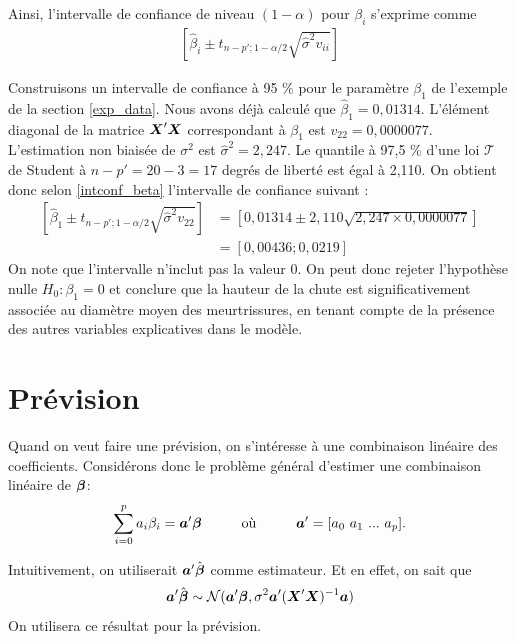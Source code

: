 Ainsi, l'intervalle de confiance de niveau $(1-\alpha)$ pour $\beta_i$ s'exprime comme
\begin{eqnarray}
\left[ \hat\beta_i\pm t_{n-p';1-\alpha/2}\sqrt{\hat\sigma^2 v_{ii}} \right]
\label{intconf_beta}
\end{eqnarray}

\begin{exemple}
Construisons un intervalle de confiance à 95 $\%$ pour le paramètre $\beta_1$ de l'exemple de la section \ref{exp_data}. Nous avons déjà calculé que $\hat\beta_1=0,01314$. L'élément diagonal de la matrice $\mbox{\boldmath$X$\unboldmath}'\mbox{\boldmath$X$\unboldmath}$ correspondant à $\beta_1$ est $v_{22}=0,0000077$. L'estimation non biaisée de $\sigma^2$ est $\hat\sigma^2=2,247$. Le quantile à 97,5 $\%$ d'une loi $\mathcal{T}$ de Student à $n-p'=20-3=17$ degrés de liberté est égal à 2,110.  On obtient donc selon \eqref{intconf_beta} l'intervalle de confiance suivant :
\begin{align*}
\left[ \hat\beta_1\pm t_{n-p'; 1-\alpha/2}\sqrt{\hat\sigma^2 v_{22}} \right] &=\left[0,01314\pm2,110\sqrt{2,247\times 0,0000077}\right]\\
&=[0,00436;0,0219]
\end{align*}
On note que l'intervalle n'inclut pas la valeur 0. On peut donc rejeter l'hypothèse nulle $H_0: \beta_1=0$  et conclure que la hauteur de la chute est significativement associée au diamètre moyen des meurtrissures, en tenant compte de la présence des autres variables explicatives dans le modèle.
\end{exemple}


\section{Prévision}
\label{sec:PrévisionRLM}


Quand on veut faire une prévision, on s'intéresse à une combinaison linéaire des coefficients. Considérons donc le problème général d'estimer une combinaison linéaire de $\mbox{\boldmath$\beta$}$:
\begin{equation}
\sum_{i=0}^p a_i \beta_i = \mbox{\boldmath$a$\unboldmath}'\mbox{\boldmath$\beta$}
	\hspace{1cm} \mbox{o\`u} \hspace{1cm} \mbox{\boldmath$a$\unboldmath}'=[a_0\ a_1 \ ... \ a_p].
\label{eq:abeta}
\end{equation}
	
Intuitivement, on utiliserait $\mbox{\boldmath$a$\unboldmath}'\hat{\mbox{\boldmath$\beta$}}$ comme estimateur. Et en effet, on sait que
\begin{equation}
\mbox{\boldmath$a$\unboldmath}'\hat{\mbox{\boldmath$\beta$}} \sim \mathcal{N}(\mbox{\boldmath$a$\unboldmath}'\mbox{\boldmath$\beta$}, \sigma^2\mbox{\boldmath$a$\unboldmath}'(\mbox{\boldmath$X$\unboldmath}'\mbox{\boldmath$X$\unboldmath})^{-1}\mbox{\boldmath$a$\unboldmath})
\label{eq:distabeta}
\end{equation}
On utilisera ce résultat pour la prévision.

